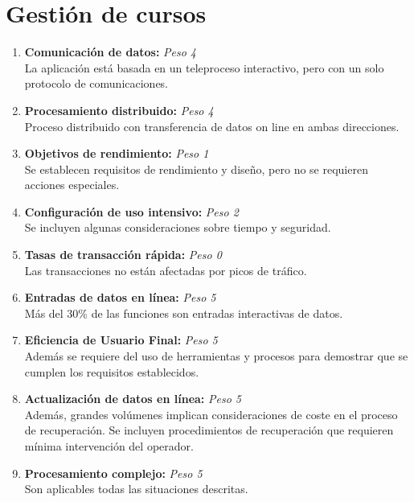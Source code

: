 \documentclass[11pt,a4paper,spanish,twoside]{book}
\begin{document}
\section{Gestión de cursos}
\begin{enumerate}[{\bf 1.}]

\item {\bf Comunicación de datos:} \emph{Peso 4} \\ La aplicación está basada en
  un teleproceso interactivo, pero con un solo protocolo de comunicaciones.

\item {\bf Procesamiento distribuido:} \emph{Peso 4} \\ Proceso distribuido
  con transferencia de datos on line en ambas direcciones. 

\item {\bf Objetivos de rendimiento:} \emph{Peso 1} \\ Se establecen requisitos
  de rendimiento y diseño, pero no se requieren acciones especiales.

\item {\bf Configuración de uso intensivo:} \emph{Peso 2} \\ Se incluyen algunas
  consideraciones sobre tiempo y seguridad. 

\item {\bf Tasas de transacción rápida:} \emph{Peso 0} \\ Las transacciones no
  están afectadas por picos de tráfico. 

\item {\bf Entradas de datos en línea:} \emph{Peso 5} \\ Más del 30\% de las
  funciones son entradas interactivas de datos. 

\item {\bf Eficiencia de Usuario Final:} \emph{Peso 5} \\ Además se requiere del
  uso de herramientas y procesos para demostrar que se cumplen los requisitos
  establecidos.

\item {\bf Actualización de datos en línea:} \emph{Peso 5} \\ Además, grandes
  volúmenes implican consideraciones de coste en el proceso de
  recuperación. Se incluyen procedimientos de recuperación que requieren
  mínima intervención del operador. 

\item {\bf Procesamiento complejo:} \emph{Peso 5} \\Son aplicables todas las
  situaciones descritas.
 

\end{enumerate}
\end{document}
